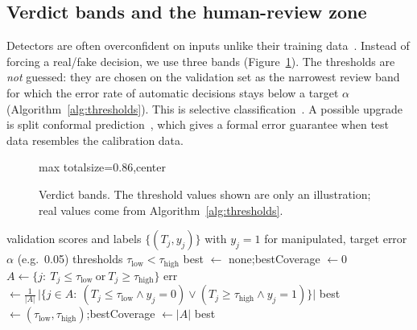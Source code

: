\documentclass[11pt,a4paper]{article}
\newenvironment{diagram}{\begin{adjustbox}{max totalsize={\linewidth}{0.86\textheight},center}}{\end{adjustbox}}
\begin{document}
\subsection{Verdict bands and the human-review zone}
Detectors are often overconfident on inputs unlike their training data~\cite{calibdeepfake}.
Instead of forcing a real/fake decision, we use three bands (Figure~\ref{fig:bands}). The
thresholds are \emph{not} guessed: they are chosen on the validation set as the narrowest review
band for which the error rate of automatic decisions stays below a target $\alpha$
(Algorithm~\ref{alg:thresholds}). This is selective classification~\cite{selective}. A
possible upgrade is split conformal prediction~\cite{conformal}, which gives a formal
error guarantee when test data resembles the calibration data.

\begin{figure}[htbp]
\centering
\begin{diagram}
\end{diagram}
\caption{Verdict bands. The threshold values shown are only an illustration; real values come from Algorithm~\ref{alg:thresholds}.}
\label{fig:bands}
\end{figure}

\begin{algorithm}[htbp]
\caption{Choosing the verdict thresholds (selective classification)}
\label{alg:thresholds}
\begin{algorithmic}[1]
\Require validation scores and labels $\{(T_j,y_j)\}$ with $y_j=1$ for manipulated, target error $\alpha$ (e.g.\ 0.05)
\Ensure thresholds $\tau_{\text{low}}<\tau_{\text{high}}$
\State best $\gets$ none;\quad bestCoverage $\gets0$
    \State $A\gets\{j:\ T_j\le\tau_{\text{low}}\ \text{or}\ T_j\ge\tau_{\text{high}}\}$ 
    \State err $\gets\frac{1}{\lvert A\rvert}\,\bigl\lvert\{j\in A:\ (T_j\le\tau_{\text{low}}\wedge y_j=0)\vee(T_j\ge\tau_{\text{high}}\wedge y_j=1)\}\bigr\rvert$
      \State best $\gets(\tau_{\text{low}},\tau_{\text{high}})$;\quad bestCoverage $\gets\lvert A\rvert$
    \EndIf
  \EndFor
\EndFor
\State \Return best
\end{algorithmic}
\end{algorithm}
\end{document}
